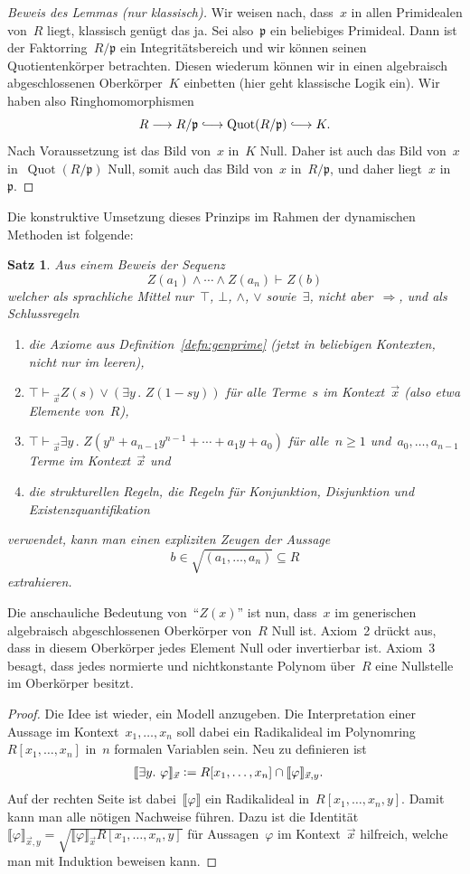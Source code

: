 \documentclass[a4paper,ngerman,12pt]{scrartcl}
\theoremstyle{definition}
\theoremstyle{plain}
\newtheorem{satz}[defn]{Satz}
\theoremstyle{remark}
\newcommand{\lhra}{\ensuremath{\lhook\joinrel\relbar\joinrel\rightarrow}}
\newcommand{\brak}[1]{\llbracket {#1} \rrbracket}
\newcommand{\pp}{\mathfrak{p}}
\DeclareMathOperator{\Quot}{Quot}
\newcommand{\seq}[1]{\mathrel{\vdash\!\!\!_{#1}}}
\renewcommand{\_}{\mathpunct{.}\,}
\newcommand{\?}{\,{:}\,}
\newcommand{\defeq}{\vcentcolon=}
\begin{document}
\begin{proof}[Beweis des Lemmas (nur klassisch)]
Wir weisen nach, dass~$x$ in allen Primidealen von~$R$ liegt, klassisch genügt
das ja. Sei also~$\pp$ ein beliebiges Primideal. Dann ist der
Faktorring~$R/\pp$ ein Integritätsbereich und wir können seinen
Quotientenkörper betrachten. Diesen wiederum können wir in einen algebraisch
abgeschlossenen Oberkörper~$K$ einbetten (hier geht klassische Logik ein). Wir
haben also Ringhomomorphismen
\[ R \longrightarrow R/\pp \lhra \Quot(R/\pp) \lhra K. \]
Nach Voraussetzung ist das Bild von~$x$ in~$K$ Null. Daher ist auch das Bild
von~$x$ in~$\Quot(R/\pp)$ Null, somit auch das Bild von~$x$ in~$R/\pp$, und
daher liegt~$x$ in~$\pp$.
\end{proof}

Die konstruktive Umsetzung dieses Prinzips im Rahmen der dynamischen Methoden
ist folgende:

\begin{satz}
Aus einem Beweis der Sequenz
\[ Z(a_1) \wedge \cdots \wedge Z(a_n) \seq{} Z(b) \]
welcher als sprachliche Mittel nur~$\top$, $\bot$, $\wedge$, $\vee$
sowie~$\exists$, nicht aber~$\Rightarrow$, und als Schlussregeln
\begin{enumerate}
\item[1.] die Axiome aus Definition~\ref{defn:genprime} (jetzt in beliebigen
Kontexten, nicht nur im leeren),
\item[2.] $\top \seq{\vec x} Z(s) \vee (\exists y\_ Z(1-sy))$ für alle
Terme~$s$ im Kontext~$\vec x$ (also etwa Elemente von~$R$),
\item[3.] $\top \seq{\vec x} \exists y\_ Z(y^n + a_{n-1}y^{n-1} + \cdots +
a_1y + a_0)$ für alle~$n \geq 1$ und~$a_0,\ldots,a_{n-1}$ Terme im
Kontext~$\vec x$ und
\item[4.] die strukturellen Regeln, die Regeln für Konjunktion, Disjunktion
und Existenzquantifikation
\end{enumerate}
verwendet, kann man einen expliziten Zeugen der Aussage
\[ b \in \sqrt{(a_1,\ldots,a_n)} \subseteq R \]
extrahieren.
\end{satz}
Die anschauliche Bedeutung von~"`$Z(x)$"' ist nun, dass~$x$ im generischen
algebraisch abgeschlossenen Oberkörper von~$R$ Null ist. Axiom~2 drückt aus,
dass in diesem Oberkörper jedes Element Null oder invertierbar ist. Axiom~3
besagt, dass jedes normierte und nichtkonstante Polynom über~$R$ eine
Nullstelle im Oberkörper besitzt.
\begin{proof}Die Idee ist wieder, ein Modell anzugeben. Die
Interpretation einer Aussage im Kontext~$x_1,\ldots,x_n$ soll dabei ein
Radikalideal im Polynomring~$R[x_1,\ldots,x_n]$ in~$n$ formalen Variablen sein.
Neu zu definieren ist
\begin{align*}
  \brak{\exists y\_ \varphi}_{\vec x} &\defeq R[x_1,\ldots,x_n] \cap \brak{\varphi}_{\vec x,y}.
\end{align*}
Auf der rechten Seite ist dabei~$\brak{\varphi}$ ein Radikalideal
in~$R[x_1,\ldots,x_n,y]$. Damit kann man alle nötigen Nachweise führen.
Dazu ist die Identität~$\brak{\varphi}_{\vec x,y} =
\sqrt{\brak{\varphi}_{\vec x} R[x_1,\ldots,x_n,y]}$ für Aussagen~$\varphi$ im Kontext~$\vec x$
hilfreich, welche man mit Induktion beweisen kann.
\end{proof}
\end{document}

